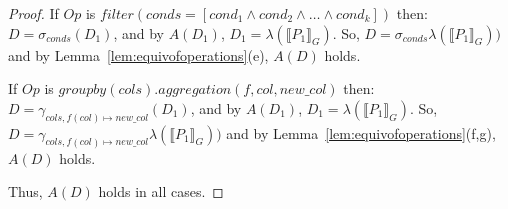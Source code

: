 \begin{proof}
    \item If $Op$ is $filter(conds = [cond_1 \land cond_2 \land \dots \land cond_k])$ then: $D = \sigma_{conds}(D_1)$, and by $A(D_1)$, $D_1 = \lambda(\llbracket P_1\rrbracket_G)$. So, $D = \sigma_{conds}\lambda(\llbracket P_1\rrbracket_G))$ and by Lemma~\ref{lem:equivofoperations}(e), $A(D)$ holds.

    
    \item If $Op$ is $groupby(cols).aggregation(f, col, new\_col)$ then: $D = \gamma_{cols, f(col) \mapsto new\_col}(D_1)$, and by $A(D_1)$, $D_1 = \lambda(\llbracket P_1\rrbracket_G)$. So, $D = \gamma_{cols, f(col) \mapsto new\_col}\lambda(\llbracket P_1\rrbracket_G))$ and by  Lemma~\ref{lem:equivofoperations}(f,g), $A(D)$ holds.
    
\squishend
Thus, $A(D)$ holds in all cases.
\end{proof}
